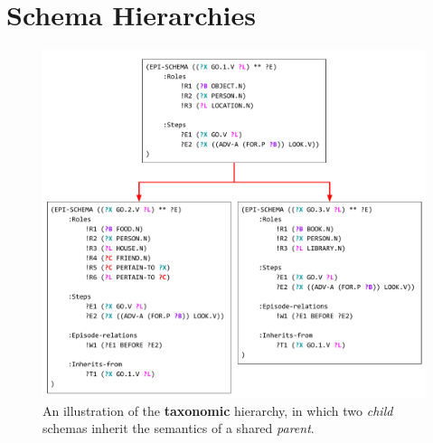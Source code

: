 \section{Schema Hierarchies}
\label{sec:schema_hier}

\begin{figure}
    \centering
    \includegraphics[width=\columnwidth]{CH3_schemas/inheritance}
    \caption{An illustration of the \textbf{taxonomic} hierarchy, in which two \textit{child} schemas inherit the semantics of a shared \textit{parent}.}
    \label{fig:spec_hier}
\end{figure}

